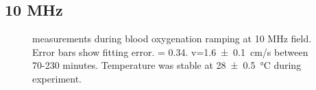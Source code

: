 \subsection{10 MHz}

\begin{figure}[htp]
\centering
{}



\caption[\Ttwo measurements during blood oxygenation ramping at 10 MHz field]{\Ttwo measurements during blood oxygenation ramping at 10 MHz field. Error bars show \Ttwo fitting error. \Hct = 0.34. v=\SI{1.6 \pm 0.1}{cm/s} between  70-230 minutes. Temperature was stable at \SI{28 \pm 0.5}{\celsius} during experiment.}
\label{fig:contflow-10mhzT2Time}
\end{figure}

